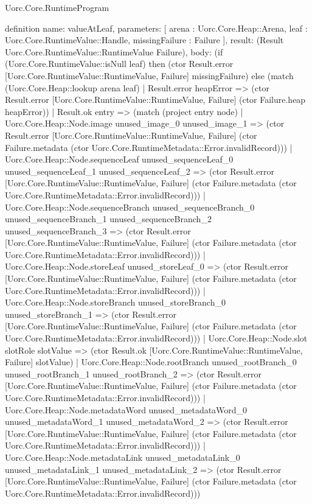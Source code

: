 \begin{lexlean}{Uorc.Core.RuntimeProgram}
\begin{semanticmodule}
definition{
  name: valueAtLeaf,
  parameters: [
    arena : Uorc.Core.Heap::Arena,
    leaf : Uorc.Core.RuntimeValue::Handle,
    missingFailure : Failure
  ],
  result: (Result Uorc.Core.RuntimeValue::RuntimeValue Failure),
  body: (if (Uorc.Core.RuntimeValue::isNull leaf) then (ctor Result.error [Uorc.Core.RuntimeValue::RuntimeValue, Failure] missingFailure) else (match (Uorc.Core.Heap::lookup arena leaf)
    | Result.error heapError => (ctor Result.error [Uorc.Core.RuntimeValue::RuntimeValue, Failure] (ctor Failure.heap heapError))
    | Result.ok entry => (match (project entry node)
      | Uorc.Core.Heap::Node.image unused_image_0 unused_image_1 => (ctor Result.error [Uorc.Core.RuntimeValue::RuntimeValue, Failure] (ctor Failure.metadata (ctor Uorc.Core.RuntimeMetadata::Error.invalidRecord)))
      | Uorc.Core.Heap::Node.sequenceLeaf unused_sequenceLeaf_0 unused_sequenceLeaf_1 unused_sequenceLeaf_2 => (ctor Result.error [Uorc.Core.RuntimeValue::RuntimeValue, Failure] (ctor Failure.metadata (ctor Uorc.Core.RuntimeMetadata::Error.invalidRecord)))
      | Uorc.Core.Heap::Node.sequenceBranch unused_sequenceBranch_0 unused_sequenceBranch_1 unused_sequenceBranch_2 unused_sequenceBranch_3 => (ctor Result.error [Uorc.Core.RuntimeValue::RuntimeValue, Failure] (ctor Failure.metadata (ctor Uorc.Core.RuntimeMetadata::Error.invalidRecord)))
      | Uorc.Core.Heap::Node.storeLeaf unused_storeLeaf_0 => (ctor Result.error [Uorc.Core.RuntimeValue::RuntimeValue, Failure] (ctor Failure.metadata (ctor Uorc.Core.RuntimeMetadata::Error.invalidRecord)))
      | Uorc.Core.Heap::Node.storeBranch unused_storeBranch_0 unused_storeBranch_1 => (ctor Result.error [Uorc.Core.RuntimeValue::RuntimeValue, Failure] (ctor Failure.metadata (ctor Uorc.Core.RuntimeMetadata::Error.invalidRecord)))
      | Uorc.Core.Heap::Node.slot slotRole slotValue => (ctor Result.ok [Uorc.Core.RuntimeValue::RuntimeValue, Failure] slotValue)
      | Uorc.Core.Heap::Node.rootBranch unused_rootBranch_0 unused_rootBranch_1 unused_rootBranch_2 => (ctor Result.error [Uorc.Core.RuntimeValue::RuntimeValue, Failure] (ctor Failure.metadata (ctor Uorc.Core.RuntimeMetadata::Error.invalidRecord)))
      | Uorc.Core.Heap::Node.metadataWord unused_metadataWord_0 unused_metadataWord_1 unused_metadataWord_2 => (ctor Result.error [Uorc.Core.RuntimeValue::RuntimeValue, Failure] (ctor Failure.metadata (ctor Uorc.Core.RuntimeMetadata::Error.invalidRecord)))
      | Uorc.Core.Heap::Node.metadataLink unused_metadataLink_0 unused_metadataLink_1 unused_metadataLink_2 => (ctor Result.error [Uorc.Core.RuntimeValue::RuntimeValue, Failure] (ctor Failure.metadata (ctor Uorc.Core.RuntimeMetadata::Error.invalidRecord)))
}
\end{semanticmodule}
\end{lexlean}
